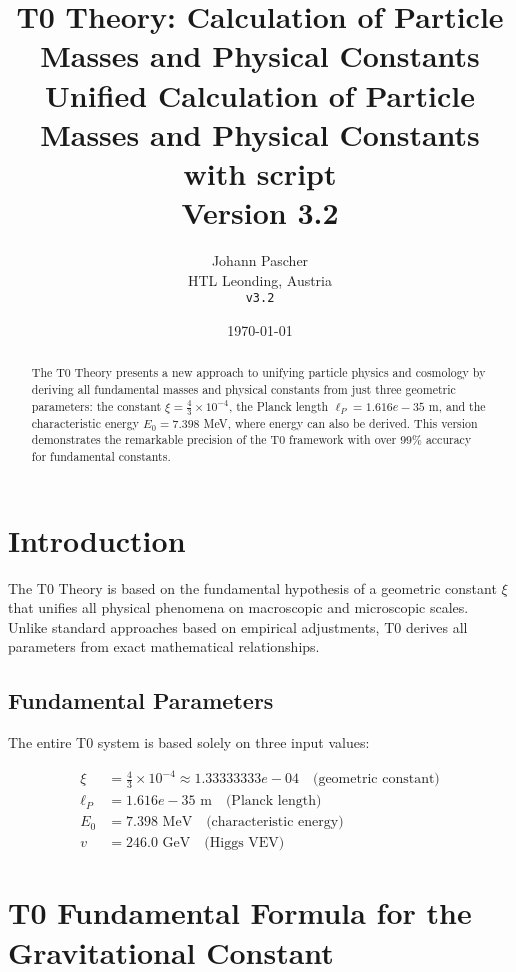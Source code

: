 \documentclass[11pt,a4paper]{article}
\title{\textbf{T0 Theory: Calculation of Particle Masses and Physical Constants}\\
	\large Unified Calculation of Particle Masses and Physical Constants  with script\\
	\large Version 3.2}
\author{Johann Pascher\\
	HTL Leonding, Austria\\
	\texttt{v3.2}}
\date{\today}
\begin{document}
	\maketitle
	
	\begin{abstract}
		The T0 Theory presents a new approach to unifying particle physics and cosmology by deriving all fundamental masses and physical constants from just three geometric parameters: the constant $\xi = \frac{4}{3} \times 10^{-4}$, the Planck length $\ell_P = 1.616e-35$ m, and the characteristic energy $E_0 = 7.398$ MeV, where energy can also be derived. This version demonstrates the remarkable precision of the T0 framework with over 99\% accuracy for fundamental constants.
	\end{abstract}
	
	\tableofcontents
	\newpage
	
	\section{Introduction}
	
	The T0 Theory is based on the fundamental hypothesis of a geometric constant $\xi$ that unifies all physical phenomena on macroscopic and microscopic scales. Unlike standard approaches based on empirical adjustments, T0 derives all parameters from exact mathematical relationships.
	
	\subsection{Fundamental Parameters}
	
	The entire T0 system is based solely on three input values:
	
	\begin{align}
		\xi &= \frac{4}{3} \times 10^{-4} \approx 1.33333333e-04 \quad \text{(geometric constant)} \\
		\ell_P &= 1.616e-35 \text{ m} \quad \text{(Planck length)} \\
		E_0 &= 7.398 \text{ MeV} \quad \text{(characteristic energy)} \\
		v &= 246.0 \text{ GeV} \quad \text{(Higgs VEV)}
	\end{align}
	
	\section{T0 Fundamental Formula for the Gravitational Constant}
	
\end{document}
